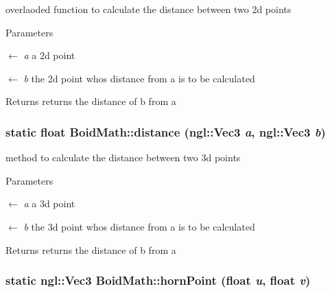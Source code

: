 overlaoded function to calculate the distance between two 2d points 
\begin{DoxyParams}{Parameters}
\item[\mbox{$\leftarrow$} {\em a}]a 2d point \item[\mbox{$\leftarrow$} {\em b}]the 2d point whos distance from a is to be calculated \end{DoxyParams}
\begin{DoxyReturn}{Returns}
returns the distance of b from a 
\end{DoxyReturn}
\hypertarget{classBoidMath_a85211e5039504d81a63ce05bfba4ba87}{
\subsubsection[{distance}]{\setlength{\rightskip}{0pt plus 5cm}static float BoidMath::distance (ngl::Vec3 {\em a}, \/  ngl::Vec3 {\em b})}}
\label{classBoidMath_a85211e5039504d81a63ce05bfba4ba87}


method to calculate the distance between two 3d points 
\begin{DoxyParams}{Parameters}
\item[\mbox{$\leftarrow$} {\em a}]a 3d point \item[\mbox{$\leftarrow$} {\em b}]the 3d point whos distance from a is to be calculated \end{DoxyParams}
\begin{DoxyReturn}{Returns}
returns the distance of b from a 
\end{DoxyReturn}
\hypertarget{classBoidMath_aeaef9db8eb5da71f8f10c4892ff044ae}{
\subsubsection[{hornPoint}]{\setlength{\rightskip}{0pt plus 5cm}static ngl::Vec3 BoidMath::hornPoint (float {\em u}, \/  float {\em v})}}
\label{classBoidMath_aeaef9db8eb5da71f8f10c4892ff044ae}


